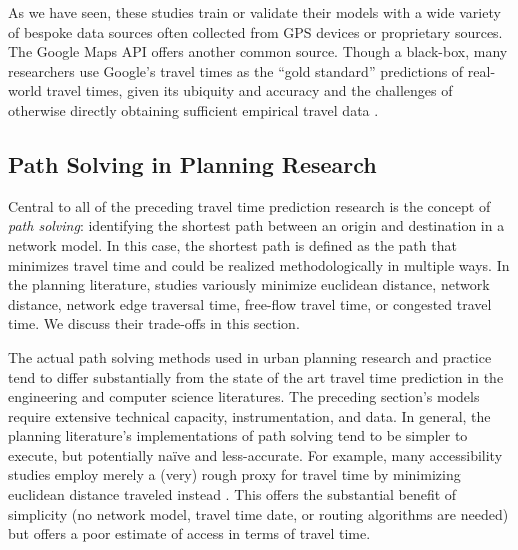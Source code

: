 \documentclass[12pt,letterpaper]{article} %
\begin{document}
    As we have seen, these studies train or validate their models with a wide variety of bespoke data sources often collected from GPS devices or proprietary sources. The Google Maps API offers another common source. Though a black-box, many researchers use Google's travel times as the \enquote{gold standard} predictions of real-world travel times, given its ubiquity and accuracy and the challenges of otherwise directly obtaining sufficient empirical travel data \citep[e.g.,][]{goudarzi2018travel,stanojevic2019mapreuse,ludwig2023traffic}.

    \subsection{Path Solving in Planning Research}

    Central to all of the preceding travel time prediction research is the concept of \textit{path solving}: identifying the shortest path between an origin and destination in a network model. In this case, the shortest path is defined as the path that minimizes travel time and could be realized methodologically in multiple ways. In the planning literature, studies variously minimize euclidean distance, network distance, network edge traversal time, free-flow travel time, or congested travel time. We discuss their trade-offs in this section.

    The actual path solving methods used in urban planning research and practice tend to differ substantially from the state of the art travel time prediction in the engineering and computer science literatures. The preceding section's models require extensive technical capacity, instrumentation, and data. In general, the planning literature's implementations of path solving tend to be simpler to execute, but potentially naïve and less-accurate. For example, many accessibility studies employ merely a (very) rough proxy for travel time by minimizing euclidean distance traveled instead \citep[e.g.,][]{macfarlane2021modeling,pearsall2020locating}. This offers the substantial benefit of simplicity (no network model, travel time date, or routing algorithms are needed) but offers a poor estimate of access in terms of travel time.
\end{document}
